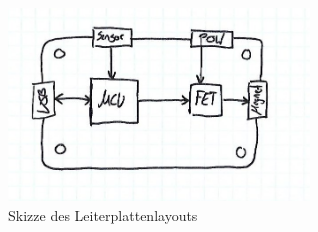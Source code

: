 

\begin{figure}[ht]
    \begin{center}
      \includegraphics[width=8cm]{assets/images/board}
    \end{center}
    \vspace{-3ex}
    \caption{Skizze des Leiterplattenlayouts}
    \label{fig:board}
  \end{figure}